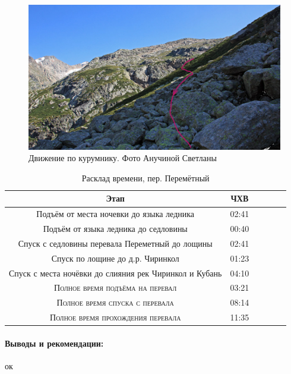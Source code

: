 \begin{figure}[h!]
	\centering
	\includegraphics[width=0.7\linewidth]{../pics/peremkurum.png}
	\caption{Движение по курумнику. Фото Анучиной Светланы}
	\label{perem_down}
\end{figure} 

\begin{table}[h!]
	\centering
	\begin{tabular}{|c|c|c|c|c|c|} 
		\hline 
		Этап & ЧХВ \\ 	
		\hline 
		Подъём от места ночевки до языка ледника  & 02:41 \\
		Подъём от языка ледника до седловины  & 00:40 \\
		Спуск с седловины перевала Переметный до лощины & 02:41\\ 
		Спуск по лощине до д.р. Чиринкол & 01:23\\ 
		Спуск с места ночёвки до слияния рек Чиринкол и Кубань & 04:10 \\
		
		\hline
		\textsc{Полное время подъёма на перевал  }& 03:21\\
		\textsc{Полное время спуска с перевала }& 08:14 \\
		\textsc{Полное время прохождения перевала }& 11:35 \\
		\hline
	\end{tabular}
	\caption{Расклад времени, пер. Перемётный}
\end{table}

\paragraph{Выводы и рекомендации:} ок

\clearpage